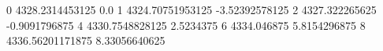 0 4328.2314453125 0.0
1 4324.70751953125 -3.52392578125
2 4327.322265625 -0.9091796875
4 4330.7548828125 2.5234375
6 4334.046875 5.8154296875
8 4336.56201171875 8.33056640625
